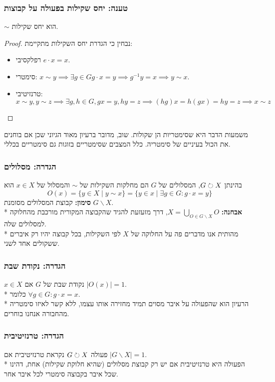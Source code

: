 \subsubsection{טענה: יחס שקילות בפעולה על קבוצות}
$\sim$ הוא יחס שקילות.
\begin{proof}
	נבחין כי הגדרת יחס השקילות מתקיימת:
	\begin{itemize}
		\item רפלקסיבי $e \cdot x = x$.
		\item סימטרי: $x \sim y \implies \exists g \in G g \cdot x = y \implies g^{-1} y = x \implies y \sim x$.
		\item טרנזיטיבי: $x \sim y, y \sim z \implies \exists g, h \in G, gx = y, hy = z \implies (hg)x = h (gx) = hy = z \implies x \sim z$
	\end{itemize}
\end{proof}
משמעות הדבר היא שסימטריות הן שקולות. שוב, מדובר ברעיון מאוד הגיוני שכן אם בוחנים את הכול בעיניים של סימטריה. כלל המצבים שסימטריים בזוגות גם סימטריים בכללי.

\subsubsection{הגדרה: מסלולים}
בהינתן $G \circlearrowright X$, המסלולים של $G$ הם מחלקות השקילות של $\sim$ והמסלול של $x \in X$ הוא
\[
	O(x) = \{ y \in X \mid y \sim x\} = \{ y \in x \mid \exists g \in G : g \cdot x = y \}
\]
\textbf{סימון:} קבוצת המסלולים מסומנת $G \backslash X$. \\*
\textbf{אבחנה:} $X = \bigcup_{O \in G\backslash X} O$, דרך מזעזעת להגיד שהקבוצה המקורית מורכבת מהחלוקה למסלולים שלה. \\*
מהותית אנו מדברים פה על החלוקה של $X$ לפי השקילות, בכל קבוצה יהיו רק איברים ששקולים אחד לשני.

\subsubsection{הגדרה: נקודת שבת}
$x \in X$ נקודת שבת של $G$ אם $|O(x)| = 1$.\\*
כלומר $\forall g \in G : g \cdot x = x$.\\*
הרעיון הוא שהפעולה על איבר מסוים תמיד מחזירה אותו עצמו, ללא קשר לאיזו סימטריה מהחבורה אנחנו בוחרים.

\subsubsection{הגדרה: טרנזיטיבית}
פעולה $G \circlearrowright X$ נקראת טרנזיטיבית אם $|G \backslash X| = 1$. \\*
הפעולה היא טרנזיטיבית אם יש רק קבוצת מסלולים (שהיא חלוקת שקילות) אחת, דהינו שכל איבר בקבוצה סימטרי לכל איבר אחר.

